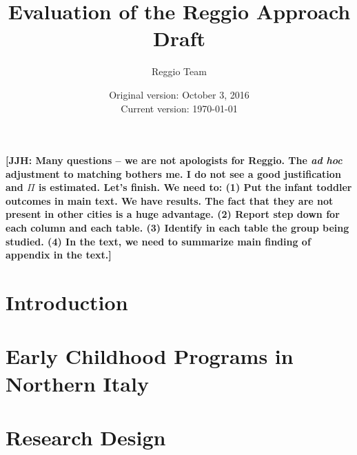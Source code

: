 






\title{\Large \textbf{Evaluation of the Reggio Approach} \\ Draft}
\author{\normalsize Reggio Team}
\date{\normalsize Original version: October 3, 2016 \\ Current version: \today}
\maketitle

\textbf{[JJH: Many questions -- we are not apologists for Reggio. The \emph{ad hoc} adjustment to matching bothers me. I do not see a good justification and $\Pi$ is estimated. Let's finish. We need to: (1) Put the infant toddler outcomes in main text. We have results. The fact that they are not present in other cities is a huge advantage. (2) Report step down for each column and each table. (3) Identify in each table the group being studied. (4) In the text, we need to summarize main finding of appendix in the text.]}

\tableofcontents

\clearpage
\doublespacing

\section{Introduction}
\label{sec:introduction}


\section{Early Childhood Programs in Northern Italy}
\label{sec:ece-italy}


\section{Research Design}
\label{sec:data}




